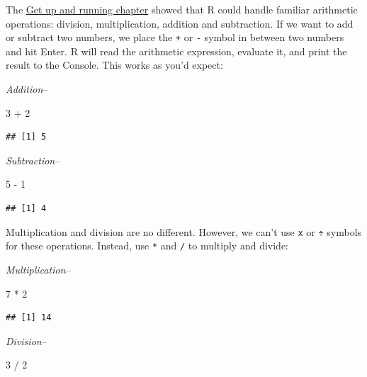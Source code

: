 \documentclass[
]{book}
\newenvironment{Shaded}{\begin{snugshade}}{\end{snugshade}}
\newcommand{\DecValTok}[1]{\textcolor[rgb]{0.00,0.00,0.81}{#1}}
\newcommand{\SpecialCharTok}[1]{\textcolor[rgb]{0.00,0.00,0.00}{#1}}
\begin{document}
The \protect\hyperlink{working-at-console}{Get up and running chapter} showed that R could handle familiar arithmetic operations: division, multiplication, addition and subtraction. If we want to add or subtract two numbers, we place the \texttt{+} or \texttt{-} symbol in between two numbers and hit Enter. R will read the arithmetic expression, evaluate it, and print the result to the Console. This works as you'd expect:

\emph{Addition}--

\begin{Shaded}
\begin{Highlighting}[]
\DecValTok{3} \SpecialCharTok{+} \DecValTok{2}
\end{Highlighting}
\end{Shaded}

\begin{verbatim}
## [1] 5
\end{verbatim}

\emph{Subtraction}--

\begin{Shaded}
\begin{Highlighting}[]
\DecValTok{5} \SpecialCharTok{{-}} \DecValTok{1}
\end{Highlighting}
\end{Shaded}

\begin{verbatim}
## [1] 4
\end{verbatim}

Multiplication and division are no different. However, we can't use \texttt{x} or \texttt{÷} symbols for these operations. Instead, use \texttt{*} and \texttt{/} to multiply and divide:

\emph{Multiplication}--

\begin{Shaded}
\begin{Highlighting}[]
\DecValTok{7} \SpecialCharTok{*} \DecValTok{2}
\end{Highlighting}
\end{Shaded}

\begin{verbatim}
## [1] 14
\end{verbatim}

\emph{Division}--

\begin{Shaded}
\begin{Highlighting}[]
\DecValTok{3} \SpecialCharTok{/} \DecValTok{2}
\end{Highlighting}
\end{Shaded}
\end{document}
